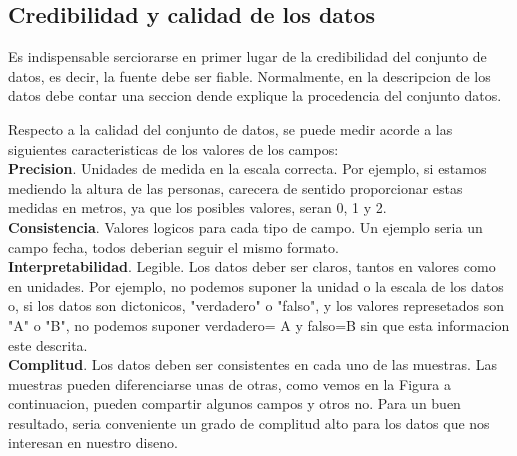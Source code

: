 \subsection{Credibilidad y calidad de los datos}
Es indispensable  serciorarse en primer lugar de la credibilidad del conjunto de datos, es decir, la fuente debe ser fiable. Normalmente,
en la descripcion de los datos debe contar una seccion dende explique la procedencia del conjunto datos.

Respecto a la calidad del conjunto de datos, se puede medir acorde a las siguientes caracteristicas de los valores de los campos:\\

\textbf{Precision}. Unidades de medida en la escala correcta. Por ejemplo, si estamos mediendo la altura
de las personas, carecera de sentido proporcionar estas medidas en metros, ya que los posibles valores, seran 0, 1 y 2.\\

 \textbf{Consistencia}. Valores logicos para cada tipo de campo. Un ejemplo seria un campo fecha, todos deberian
seguir el mismo formato.\\

\textbf{Interpretabilidad}. Legible. Los datos deber ser claros, tantos en valores como en unidades. Por ejemplo, no podemos
suponer la unidad o la escala de los datos o, si los datos son dictonicos, "verdadero" o "falso", y los valores represetados son 
"A" o "B", no podemos suponer verdadero= A y falso=B sin que esta informacion este descrita. \\

\textbf{Complitud}. Los datos deben ser consistentes en cada uno de las muestras. Las muestras pueden diferenciarse
 unas de otras, como vemos en la Figura  a continuacion, pueden compartir algunos campos y otros no. Para un buen resultado, seria 
conveniente un grado de complitud alto para los datos que nos interesan en nuestro diseno.


